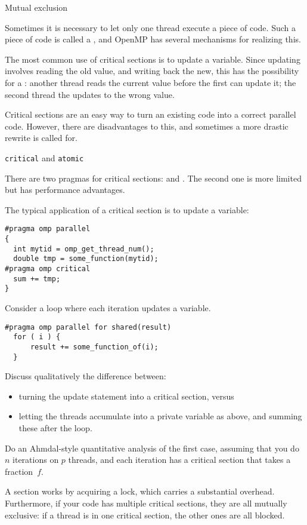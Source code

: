 {Mutual exclusion}

Sometimes it is necessary to let only one thread execute a piece of code.
Such a piece of code is called a , and
OpenMP has several mechanisms for realizing this.

The most common use of critical sections is to update a variable. Since updating
involves reading the old value, and writing back the new, this has the possibility
for a : another thread reads the current value
before the first can update it; the second thread the updates to the wrong value.

Critical sections are an easy way to turn an existing code into a correct parallel code.
However, there are disadvantages to this, and sometimes a more drastic rewrite
is called for.

 {\texttt{critical} and \texttt{atomic}}

There are two pragmas for critical sections:  and .
The second one is more limited but has performance advantages.

The typical application of a critical section is to update a variable:
\begin{verbatim}
#pragma omp parallel
{
  int mytid = omp_get_thread_num();
  double tmp = some_function(mytid);
#pragma omp critical
  sum += tmp;
}
\end{verbatim}

\begin{exercise}
  Consider  a loop where each iteration updates a variable.
\begin{verbatim}
#pragma omp parallel for shared(result)
  for ( i ) {
      result += some_function_of(i);
  }
\end{verbatim}
  Discuss qualitatively
  the difference between:
  \begin{itemize}
  \item  turning the update statement into a critical section, versus
  \item letting the threads accumulate into a private variable  as above,
    and summing these after the loop.
  \end{itemize}  
  Do an Ahmdal-style quantitative analysis of the first case, assuming that you do $n$ iterations
  on $p$ threads, and each iteration has a critical section that takes a fraction~$f$.
\end{exercise}

A  section works by acquiring a lock, which carries a substantial overhead.
Furthermore, if your code has multiple critical sections, they are all mutually exclusive:
if a thread is in one critical section, the other ones are all blocked.


